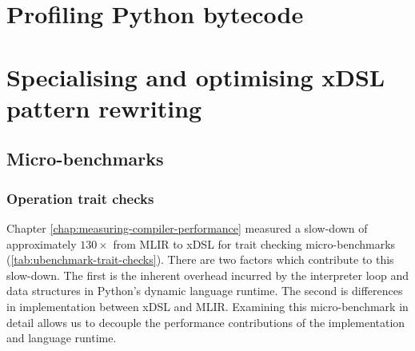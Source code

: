 











\chapter{Profiling Python bytecode} %
\label{chap:profiling-bytecode}






\chapter{Specialising and optimising xDSL pattern rewriting}
\label{chap:specialising-optimising-pattern-rewriting}

\section{Micro-benchmarks}


\subsection{Operation trait checks}

Chapter \ref{chap:measuring-compiler-performance} measured a slow-down of approximately $130\times$ from MLIR to xDSL for trait checking micro-benchmarks (\autoref{tab:ubenchmark-trait-checks}).
There are two factors which contribute to this slow-down. The first is the inherent overhead incurred by the interpreter loop and data structures in Python's dynamic language runtime. The second is differences in implementation between xDSL and MLIR.
Examining this micro-benchmark in detail allows us to decouple the performance contributions of the implementation and language runtime.

